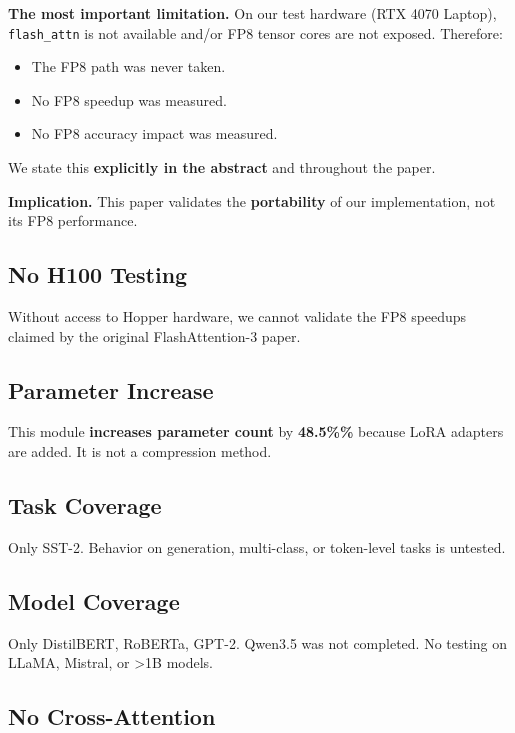 \textbf{The most important limitation.} On our test hardware (RTX 4070 Laptop), 
\texttt{flash\_attn} is not available and/or FP8 tensor cores are not exposed. 
Therefore:

\begin{itemize}
\item The FP8 path was never taken.
\item No FP8 speedup was measured.
\item No FP8 accuracy impact was measured.

\end{itemize}
We state this \textbf{explicitly in the abstract} and throughout the paper.

\textbf{Implication.} This paper validates the \textbf{portability} of our 
implementation, not its FP8 performance.

\subsection{No H100 Testing}

Without access to Hopper hardware, we cannot validate the FP8 speedups 
claimed by the original FlashAttention-3 paper.

\subsection{Parameter Increase}

This module \textbf{increases parameter count} by \textbf{48.5\%\%} because 
LoRA adapters are added. It is not a compression method.

\subsection{Task Coverage}

Only SST-2. Behavior on generation, multi-class, or token-level tasks 
is untested.

\subsection{Model Coverage}

Only DistilBERT, RoBERTa, GPT-2. Qwen3.5 was not completed. No testing on 
LLaMA, Mistral, or >1B models.

\subsection{No Cross-Attention}

